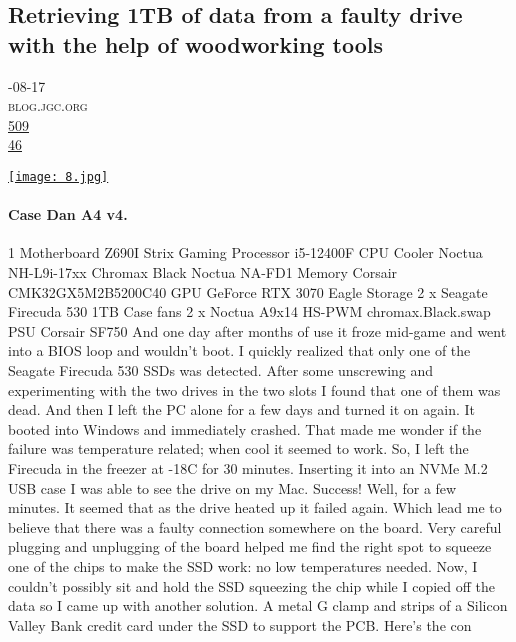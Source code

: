 \documentclass[10pt,a4paper]{article}
\begin{document}
\subsection{Retrieving 1TB of data from a faulty drive with the help of woodworking tools}
\noindent\begin{minipage}[t]{0.20\linewidth}
\vspace{0pt}
\noindent\textsc{\footnotesize
{\scriptsize\faCalendar}-08-17 \\
{\scriptsize\faGlobe}\space 
blog.jgc.org \\
{\scriptsize\faThumbsOUp}\space 
\href{http://news.ycombinator.com/item?id=37160783\&utm\_term=comment}{509} \\
{\scriptsize\faComments}\space 
\href{http://news.ycombinator.com/item?id=37160783\&utm\_term=comment}{46} \\
}
\end{minipage} %
\begin{minipage}[t]{0.80\linewidth}
\vspace{0pt}
\begin{multicols}{2}

    \href{https://blog.jgc.org/2023/08/retrieving-1tb-of-data-from-faulty.html?utm\_source=hackernewsletter\&utm\_medium=email\&utm\_term=fav}{
        \texttt{[image: 8.jpg]}
    }
  
\paragraph{Case Dan A4 v4.}
1
Motherboard Z690I Strix Gaming
Processor i5-12400F
CPU Cooler Noctua NH-L9i-17xx Chromax Black
Noctua NA-FD1
Memory Corsair CMK32GX5M2B5200C40
GPU GeForce RTX 3070 Eagle
Storage 2 x Seagate Firecuda 530 1TB
Case fans 2 x Noctua A9x14 HS-PWM chromax.Black.swap
PSU Corsair SF750
And one day after months of use it froze mid-game and went into a BIOS loop and wouldn't boot. I quickly realized that only one of the Seagate Firecuda 530 SSDs was detected. After some unscrewing and experimenting with the two drives in the two slots I found that one of them was dead.
And then I left the PC alone for a few days and turned it on again. It booted into Windows and immediately crashed.
That made me wonder if the failure was temperature related; when cool it seemed to work. So, I left the Firecuda in the freezer at -18C for 30 minutes. Inserting it into an NVMe M.2 USB case I was able to see the drive on my Mac. Success!
Well, for a few minutes. It seemed that as the drive heated up it failed again. Which lead me to believe that there was a faulty connection somewhere on the board. Very careful plugging and unplugging of the board helped me find the right spot to squeeze one of the chips to make the SSD work: no low temperatures needed.
Now, I couldn't possibly sit and hold the SSD squeezing the chip while I copied off the data so I came up with another solution. A metal G clamp and strips of a Silicon Valley Bank credit card under the SSD to support the PCB.
Here's the con

\end{multicols}
\end{minipage}
\end{document}

